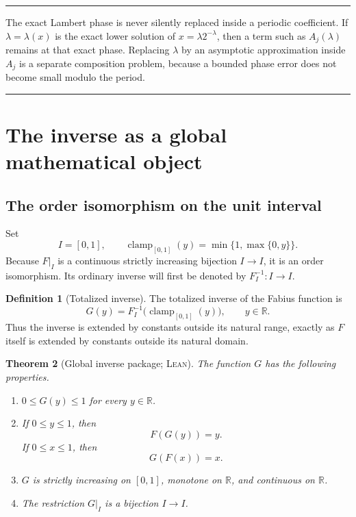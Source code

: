 \documentclass[11pt,oneside]{article}
\newtheorem{theorem}{Theorem}[section]
\theoremstyle{definition}
\newtheorem{definition}[theorem]{Definition}
\theoremstyle{remark}
\newcommand{\R}{\mathbb R}
\newenvironment{boxedremark}{%
  \par\smallskip\noindent\begin{center}\begin{minipage}{0.94\textwidth}%
  \color{black}\hrule\vspace{0.6em}\small
}{%
  \vspace{0.6em}\hrule\end{minipage}\end{center}\smallskip
}
\newcommand{\InvF}{G}
\newcommand{\clamp}{\operatorname{clamp}_{[0,1]}}
\newcommand{\Formalized}{\textsc{Lean}}
\begin{document}
\begin{boxedremark}
The exact Lambert phase is never silently replaced inside a periodic
coefficient.  If $\lambda=\lambda(x)$ is the exact lower solution of
$x=\lambda2^{-\lambda}$, then a term such as $A_j(\lambda)$ remains at that
exact phase.  Replacing $\lambda$ by an asymptotic approximation inside
$A_j$ is a separate composition problem, because a bounded phase error
does not become small modulo the period.
\end{boxedremark}

\section{The inverse as a global mathematical object}
\label{sec:inverse}

\subsection{The order isomorphism on the unit interval}

Set
\[
 I=[0,1],\qquad
 \clamp(y)=\min\{1,\max\{0,y\}\}.
\]
Because $F|_I$ is a continuous strictly increasing bijection $I\to I$, it
is an order isomorphism.  Its ordinary inverse will first be denoted by
$F_I^{-1}:I\to I$.

\begin{definition}[Totalized inverse]
\label{def:totalized-inverse}
The totalized inverse of the Fabius function is
\[
 \InvF(y)=F_I^{-1}\bigl(\clamp(y)\bigr),\qquad y\in\R.
\]
Thus the inverse is extended by constants outside its natural range,
exactly as $F$ itself is extended by constants outside its natural domain.
\end{definition}

\begin{theorem}[Global inverse package; \Formalized]
\label{thm:inverse-package}
The function $\InvF$ has the following properties.
\begin{enumerate}
\item $0\leq \InvF(y)\leq1$ for every $y\in\R$.
\item If $0\leq y\leq1$, then
\[
 F(\InvF(y))=y.
\]
If $0\leq x\leq1$, then
\[
 \InvF(F(x))=x.
\]
\item $\InvF$ is strictly increasing on $[0,1]$, monotone on $\R$, and
continuous on $\R$.
\item The restriction $\InvF|_I$ is a bijection $I\to I$.
\end{enumerate}
\end{theorem}
\end{document}
